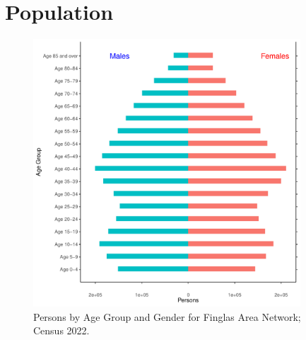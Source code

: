 \documentclass{article}
\begin{document}
\pagebreak

\section{Population} 
\label{sect:Pop}

\begin{figure}[h]
	\centering
	\includegraphics[width = 100mm]{../figures/PyramidPlot.pdf}
	\caption{Persons by Age Group and Gender for Finglas Area Network; Census 2022.}
	\label{fig:2ae19629-1a6a-13a3-e055-000000000001}
	\end{figure}
\end{document}
